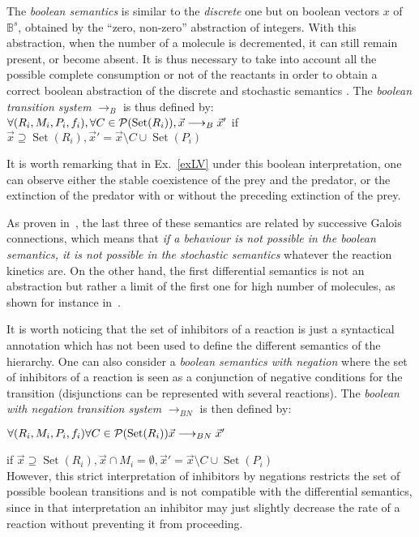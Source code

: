 \documentclass{llncs}
\newcommand{\lra}{\longrightarrow}
\DeclareMathOperator{\Set}{Set}
\begin{document}
The \emph{boolean semantics} is similar to the \emph{discrete} one
but on boolean vectors $x$ of $\mathbb{B}^s$,
obtained by the ``zero, non-zero'' abstraction of integers.
With this abstraction, when the number of a molecule is decremented,
it can still remain present, or become absent. It is thus necessary to take into account all the possible
complete consumption or not of the reactants in order to obtain a correct boolean abstraction
of the discrete and stochastic semantics \cite{FS08tcs}. The \emph{boolean transition system} $\lra_B$ is thus defined by:\\

\noindent
$\forall (R_i, M_i, P_i, f_i), \forall C\in{\cal P}(\Set(R_i)), {\vec       x}\lra_B{\vec x'}$
if ${\vec x}\supseteq \Set(R_i), {\vec x'} =       {\vec x} \setminus C \cup \Set(P_i)$

It is worth remarking that in Ex.~\ref{exLV} under this boolean interpretation, one can observe either
the stable coexistence of the prey and the predator, or the extinction of the predator with or without the preceding extinction of the prey.

As proven in~\cite{FS08tcs}, the last three of these semantics are
related by successive Galois connections, which means that \emph{if a behaviour is not possible in the boolean semantics,
it is not possible in the stochastic semantics} whatever the reaction kinetics are.
On the other hand, the first differential semantics is not an abstraction but
rather a limit of the first one for high number of molecules, as shown for instance
in~\cite{Gillespie77jpc}.

It is worth noticing that the set of inhibitors of a reaction is just a syntactical annotation
which has not been used to define the different semantics of the hierarchy.
One can also consider a \emph{boolean semantics with negation}
where the set of inhibitors of a reaction is seen as a conjunction of negative conditions for the transition
(disjunctions can be represented with several reactions). The \emph{boolean with negation transition system} $\lra_{BN}$ is then defined by:

$\forall (R_i, M_i, P_i, f_i) \forall C\in{\cal P}(\Set(R_i)) {\vec       x}\lra_{BN}{\vec x'}$

\hfill if ${\vec x}\supseteq \Set(R_i), {\vec x}\cap M_i=\emptyset, {\vec x'} =       {\vec x} \setminus C \cup \Set(P_i)$\\
However, this strict interpretation of inhibitors by negations restricts the set of possible boolean transitions
and is not compatible with the differential semantics, since in that interpretation an inhibitor may just slightly decrease the rate of a reaction without preventing it from proceeding.
\end{document}
